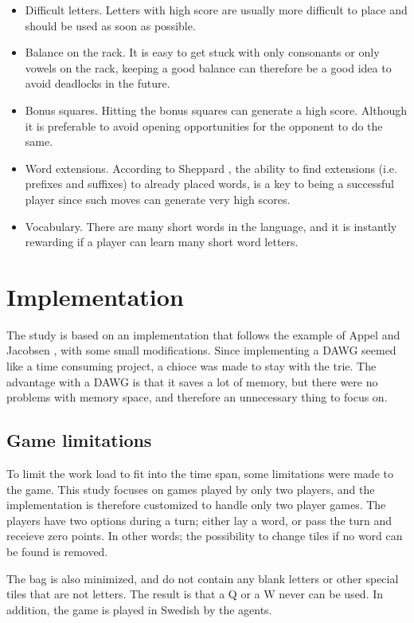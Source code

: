 \documentclass[a4paper, 12pt]{report}
\begin{document}
\begin{itemize}
\item Difficult letters. Letters with high score are usually more difficult to place and should be used as soon as possible.
\item Balance on the rack. It is easy to get stuck with only consonants or only vowels on the rack, keeping a good balance can therefore be a good idea to avoid deadlocks in the future.
\item Bonus squares. Hitting the bonus squares can generate a high score. Although it is preferable to avoid opening opportunities for the opponent to do the same.
\item Word extensions. According to Sheppard \cite{perfectgame}, the ability to find extensions (i.e. prefixes and suffixes) to already placed words, is a key to being a successful player since such moves can generate very high scores.
\item Vocabulary. There are many short words in the language, and it is instantly rewarding if a player can learn many short word letters.
\end{itemize}

\chapter{Implementation}
The study is based on an implementation that follows the example of Appel and Jacobsen \cite{fastest}, with some small modifications. Since implementing a DAWG seemed like a time consuming project, a chioce was made to stay with the trie. The advantage with a DAWG is that it saves a lot of memory, but there were no problems with memory space, and therefore an unnecessary thing to focus on.

\section{Game limitations}
To limit the work load to fit into the time span, some limitations were made to the game. This study focuses on games played by only two players, and the implementation is therefore customized to handle only two player games. The players have two options during a turn; either lay a word, or pass the turn and receieve zero points. In other words; the possibility to change tiles if no word can be found is removed. 

The bag is also minimized, and do not contain any blank letters or other special tiles that are not letters. The result is that a Q or a W never can be used. In addition, the game is played in Swedish by the agents.
\end{document}
